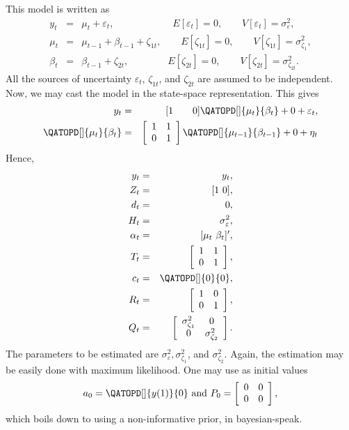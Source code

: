 \documentclass[12pt,a4paper]{article}
\begin{document}
This model is written as
\begin{eqnarray*}
y_{t} &=&\mu _{t}+\varepsilon _{t},\qquad \qquad \qquad E[\varepsilon
_{t}]=0,\qquad V[\varepsilon _{t}]=\sigma _{\varepsilon }^{2}, \\
\mu _{t} &=&\mu _{t-1}+\beta _{t-1}+\zeta _{1t},\qquad E[\zeta
_{1t}]=0,\qquad V[\zeta _{1t}]=\sigma _{\zeta _{1}}^{2}, \\
\beta _{t} &=&\beta _{t-1}+\zeta _{2t},\qquad \qquad E[\zeta _{2t}]=0,\qquad
V[\zeta _{2t}]=\sigma _{\zeta _{2t}}^{2}.
\end{eqnarray*}
All the sources of uncertainty $\varepsilon _{t}$, $\zeta _{1t}$,
and $\zeta _{2t}$ are assumed to be independent. Now, we may cast
the model in the
state-space representation. This gives%
\begin{eqnarray*}
y_{t} &=&[1\qquad 0]\QATOPD[ ] {\mu _{t}}{\beta _{t}}+0+\varepsilon _{t}, \\
\QATOPD[ ] {\mu _{t}}{\beta _{t}} &=&\left[
\begin{array}{cc}
1 & 1 \\
0 & 1%
\end{array}%
\right] \QATOPD[ ] {\mu _{t-1}}{\beta _{t-1}}+0+\eta _{t}
\end{eqnarray*}
Hence,
\begin{eqnarray*}
y_{t} &=&y_{t}, \\
Z_{t} &=&[1\text{ }0], \\
d_{t} &=&0, \\
H_{t} &=&\sigma _{\varepsilon }^{2}, \\
\alpha _{t} &=&[\mu _{t}\text{ }\beta _{t}]^{\prime }, \\
T_{t} &=&\left[
\begin{array}{cc}
1 & 1 \\
0 & 1%
\end{array}%
\right] , \\
c_{t} &=&\QATOPD[ ] {0}{0}, \\
R_{t} &=&\left[
\begin{array}{cc}
1 & 0 \\
0 & 1%
\end{array}%
\right] , \\
Q_{t} &=&\left[
\begin{array}{cc}
\sigma _{\zeta _{1}}^{2} & 0 \\
0 & \sigma _{\zeta _{2}}^{2}%
\end{array}%
\right] .
\end{eqnarray*}
The parameters to be estimated are $\sigma _{\varepsilon
}^{2},\sigma _{\zeta _{1}}^{2}$, and $\sigma _{\zeta _{2}}^{2}$.
Again, the estimation may be easily done with maximum likelihood.
One may use as initial values
\begin{equation*}
a_{0}=\QATOPD[ ] {y(1)}{0}\text{ and }P_{0}=\left[
\begin{array}{cc}
0 & 0 \\
0 & 0%
\end{array}%
\right] ,
\end{equation*}%
which boils down to using a non-informative prior, in bayesian-speak.
\end{document}
